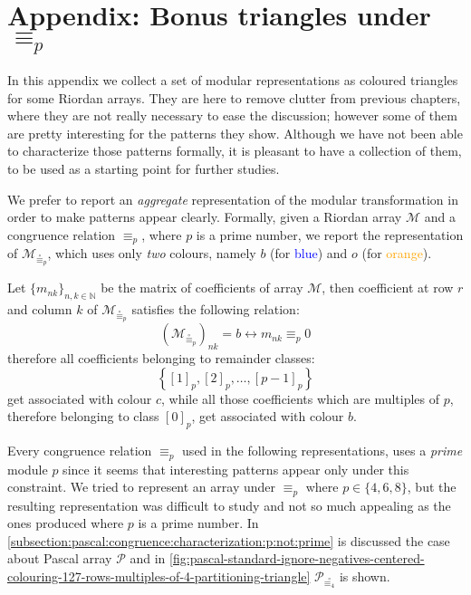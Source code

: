 
\chapter{Appendix: Bonus triangles under $\equiv_{p}$}
\label{ch:appendix:bonus:triangles}

In this appendix we collect a set of modular representations as coloured
triangles for some Riordan arrays. They are here to remove clutter from
previous chapters, where they are not really necessary to ease the discussion;
however some of them are pretty interesting for the patterns they show.
Although we have not been able to characterize those patterns formally, it is
pleasant to have a collection of them, to be used as a starting point for
further studies.

We prefer to report an \emph{aggregate} representation of the modular
transformation in order to make patterns appear clearly. Formally, given a
Riordan array $\mathcal{M}$ and a congruence relation $\equiv_{p}$, where $p$
is a prime number, we report the representation of
$\mathcal{M}_{\stackrel{\circ}\equiv_{p}}$, which uses only \emph{two} colours,
namely $b$ (for \textcolor{blue}{blue}) and $o$ (for
\textcolor{orange}{orange}). 

Let $\lbrace m_{nk}\rbrace_{n,k\in\mathbb{N}}$ be the matrix of coefficients of
array $\mathcal{M}$, then coefficient at row $r$ and column $k$ of
$\mathcal{M}_{\stackrel{\circ}\equiv_{p}}$ satisfies the following relation:
\begin{displaymath}
    \left(\mathcal{M}_{\stackrel{\circ}\equiv_{p}}\right)_{nk} = b 
    \leftrightarrow m_{nk}\equiv_{p}  0
\end{displaymath}
therefore all coefficients belonging to remainder classes:
\begin{displaymath}
    \left\lbrace[1]_{p},[2]_{p},\ldots,[p-1]_{p}\right\rbrace
\end{displaymath}
get associated with colour $c$, while all those coefficients which are
multiples of $p$, therefore belonging to class $[0]_{p}$, get associated with
colour $b$.

Every congruence relation $\equiv_{p}$ used in the following representations,
uses a \emph{prime} module $p$ since it seems that interesting patterns appear
only under this constraint. We tried to represent an array under $\equiv_{p}$
where $p\in\lbrace4,6,8\rbrace$, but the resulting representation was difficult
to study and not so much appealing as the ones produced where $p$ is a prime
number. In \autoref{subsection:pascal:congruence:characterization:p:not:prime}
is discussed the case about Pascal array $\mathcal{P}$ and in
\autoref{fig:pascal-standard-ignore-negatives-centered-colouring-127-rows-multiples-of-4-partitioning-triangle}
$\mathcal{P}_{\stackrel{\circ}{\equiv_{4}}}$ is shown.


